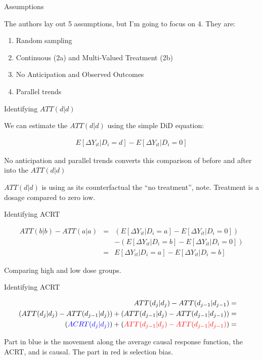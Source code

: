\documentclass{beamer}
\begin{document}
\begin{frame}{Assumptions}

The authors lay out 5 assumptions, but I’m going to focus on 4. They are:

\begin{enumerate}
\item Random sampling
\item Continuous (2a) and Multi-Valued Treatment (2b)
\item No Anticipation and Observed Outcomes
\item Parallel trends
\end{enumerate}

\end{frame}

\begin{frame}{Identifying $ATT(d|d)$}

We can estimate the $ATT(d|d)$ using the simple DiD equation:

\begin{eqnarray*}
E [ \Delta Y_{it} | D_i = d] - E[ \Delta Y_{it} | D_i = 0]
\end{eqnarray*}

\bigskip

No anticipation and parallel trends converts this comparison of before and after into the $ATT(d|d)$

\bigskip

$ATT(d|d)$ is using as its counterfactual the ``no treatment'', note.  Treatment is a dosage compared to zero iow.

\end{frame}


\begin{frame}{Identifying ACRT}


\begin{eqnarray*}
ATT(b|b) - ATT(a|a) &=& ( E[ \Delta Y_{it} | D_i =a ] - E[ \Delta Y_{it} | D_i = 0]) \\
&& - ( E[ \Delta Y_{it} | D_i =b ] - E[ \Delta Y_{it} | D_i = 0]) \\
&=& E [ \Delta Y_{it} | D_i=a] - E[\Delta Y_{it} | D_i=b]
\end{eqnarray*}

Comparing high and low dose groups.

\end{frame}

\begin{frame}{Identifying ACRT}


\begin{eqnarray*}
ATT(d_j|d_j) - ATT(d_{j-1} | d_{j-1}) &=& \\
( ATT(d_j|d_j) - ATT(d_{j-1} | d_{j}) ) + ( ATT(d_{j-1} | d_j) - ATT(d_{j-1} | d_{j-1}) )&=&  \\
 ( \textcolor{blue}{ACRT(d_j | d_j)} ) + ( \textcolor{red}{ATT(d_{j-1} | d_j) - ATT(d_{j-1} | d_{j-1})} )&=&  \\
\end{eqnarray*}

Part in blue is the movement along the average causal response function, the ACRT, and is causal.  The part in red is selection bias. 

\end{frame}
\end{document}
